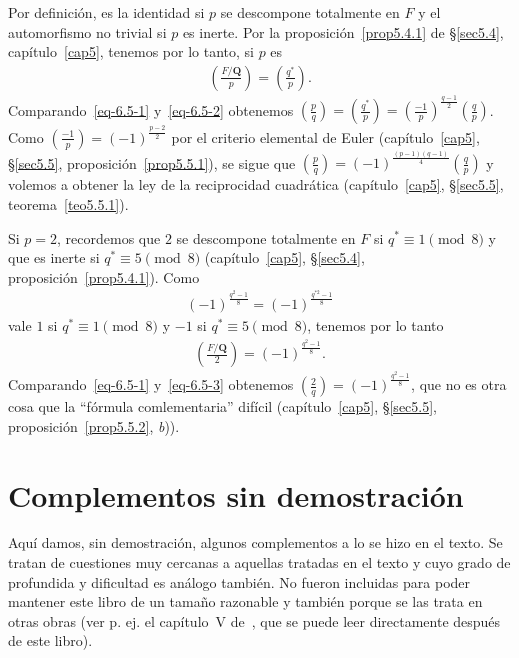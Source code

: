 \documentclass[bibtotoc,leqno,spanish]{amsbook}
\let\emph\relax %
\newcommand{\QQ}{\mathbf{Q}}
\numberwithin{equation}{section}
\theoremstyle{note}
\theoremstyle{note}
\theoremstyle{rem}
\numberwithin{theorem}{section}
\numberwithin{proposition}{section}
\numberwithin{definition}{section}
\numberwithin{lemma}{section}
\numberwithin{corollary}{section}
\numberwithin{example}{section}
\numberwithin{footnote}{section}%
\begin{document}
Por definici\'on, es la identidad si $p$ se descompone totalmente en $F$ y el automorfismo no trivial si $p$
es inerte. Por la proposici\'on~\ref{prop5.4.1} de \S\ref{sec5.4}, cap\'itulo~\ref{cap5}, tenemos por lo tanto, si $p$ es \emph{impar}
\begin{gather}\label{eq-6.5-2}
\left(\frac{F/\QQ}{p}\right) = \left(\frac{q^{*}}{p}\right).
\end{gather}
Comparando~\eqref{eq-6.5-1} y~\eqref{eq-6.5-2} obtenemos $\left(\frac{p}{q}\right)=\left(\frac{q^{*}}{p}\right)
=\left(\frac{-1}{p}\right)^{\frac{q-1}{2}}\left(\frac{q}{p}\right)$. Como $\left(\frac{-1}{p}\right)=(-1)^{\frac{p-2}{2}}$
por el criterio elemental de Euler (cap\'itulo~\ref{cap5}, \S\ref{sec5.5}, proposici\'on~\ref{prop5.5.1}), se sigue que $\left(\frac{p}{q}\right)
=(-1)^{\frac{(p-1)(q-1)}{4}}\left(\frac{q}{p}\right)$ y volemos a obtener la ley de la reciprocidad cuadr\'atica
(cap\'itulo~\ref{cap5}, \S\ref{sec5.5}, teorema~\ref{teo5.5.1}).

Si $p=2$, recordemos que $2$ se descompone totalmente en $F$ si $q^{*}\equiv 1\pmod 8$ y que es inerte
si $q^{*}\equiv 5\pmod 8$ (cap\'itulo~\ref{cap5}, \S\ref{sec5.4}, proposici\'on~\ref{prop5.4.1}). Como
\begin{gather*}
(-1)^{\frac{q^{2}-1}{8}}=(-1)^{\frac{q^{*2}-1}{8}}
\end{gather*}
vale $1$ si $q^{*}\equiv 1\pmod 8$ y $-1$ si $q^{*}\equiv 5\pmod 8$, tenemos por lo tanto
\begin{gather}\label{eq-6.5-3}
\left(\frac{F/\QQ}{2}\right)=(-1)^{\frac{q^{2}-1}{8}}.
\end{gather}
Comparando~\eqref{eq-6.5-1} y~\eqref{eq-6.5-3} obtenemos $\left(\frac{2}{q}\right) = (-1)^{\frac{q^{2}-1}{8}}$,
que no es otra cosa que la ``f\'ormula comlementaria'' dif\'icil (cap\'itulo~\ref{cap5}, \S\ref{sec5.5},
proposici\'on~\ref{prop5.5.2}, {\itshape b})).

\chapter*{Complementos sin demostraci\'on}

\setcounter{equation}{0}

Aqu\'i damos, sin demostraci\'on, algunos complementos a lo se hizo en el texto. Se tratan de cuestiones
muy cercanas a aquellas tratadas en el texto y cuyo grado de profundida y dificultad es an\'alogo tambi\'en.
No fueron incluidas para poder mantener este libro de un tama\~no razonable y tambi\'en porque se las trata
en otras obras (ver p. ej. el cap\'itulo~V de~\cite{ZariskiSamuel}, que se puede leer directamente despu\'es de este
libro).
\end{document}
